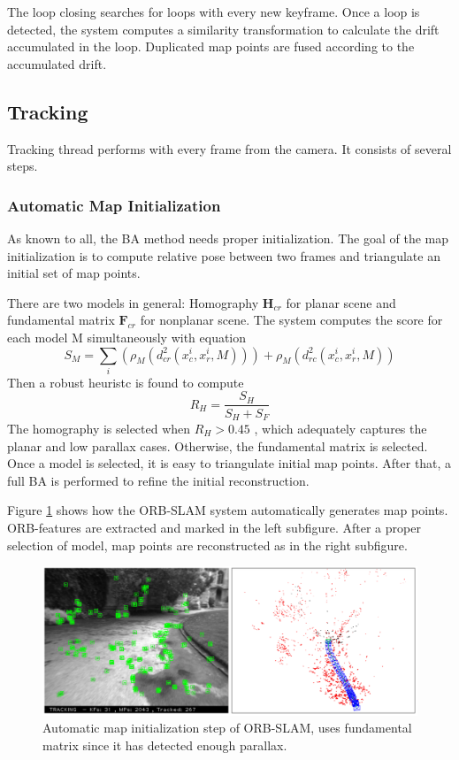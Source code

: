 \documentclass[letterpaper, 10 pt, conference]{ieeeconf}  %
\begin{document}
The loop closing searches for loops with every new keyframe. Once a loop is detected, the system computes a similarity transformation to calculate the drift accumulated in the loop. Duplicated map points are fused according to the accumulated drift.


\subsection{Tracking}
Tracking thread performs with every frame from the camera. It consists of several steps.
\subsubsection{Automatic Map Initialization}
\label{map_init}
As known to all, the BA method needs proper initialization. The goal of the map initialization is to compute relative pose between two frames and triangulate an initial set of map points.

There are two models in general: Homography $\textbf{H}_{cr}$ for planar scene and fundamental matrix $\textbf{F}_{cr}$ for nonplanar scene. The system computes the score for each model M simultaneously with equation
%
\begin{equation}
S_M = \sum_i(\rho_M(d_{cr}^2(x_c^i,x_r^i,M)))+\rho_M(d_{rc}^2(x_c^i, x_r^i, M))
\end{equation}
%
Then a robust heuristc is found to compute
%
\begin{equation}
R_H = \frac{S_H}{S_H+S_F}
\end{equation}
%
The homography is selected when $R_{H}>0.45$ , which adequately captures the planar and low parallax cases. Otherwise, the fundamental matrix is selected. Once a model is selected, it is easy to triangulate initial map points. After that, a full BA is performed to refine the initial reconstruction.

Figure \ref{initialization_step} shows how the ORB-SLAM system automatically generates map points. ORB-features are extracted and marked in the left subfigure. After a proper selection of model, map points are reconstructed as in the right subfigure.

\begin{figure}[!htbp]%
\centering
\includegraphics[scale=0.185]{./images/initialization_step}
\caption{Automatic map initialization step of ORB-SLAM, uses fundamental matrix since it has detected enough parallax.}
\label{initialization_step}
\end{figure}
\end{document}
